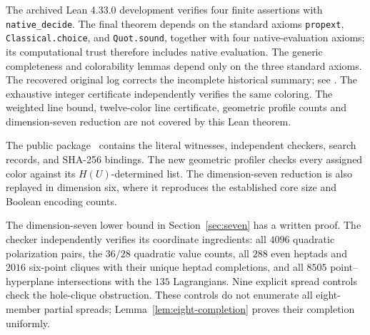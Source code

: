 The archived Lean 4.33.0 development verifies four finite assertions with
\texttt{native\_decide}. The final theorem depends on the standard axioms
\texttt{propext}, \texttt{Classical.choice}, and \texttt{Quot.sound}, together
with four native-evaluation axioms; its computational trust therefore includes
native evaluation. The generic completeness and colorability lemmas depend
only on the three standard axioms. The recovered original log corrects the
incomplete historical summary; see .
The exhaustive integer certificate independently verifies the same coloring.
The weighted line bound, twelve-color line certificate, geometric profile
counts and dimension-seven reduction
are not covered by this Lean theorem.

The public package~\cite{Package} contains the literal witnesses, independent
checkers, search records, and SHA-256 bindings. The new geometric profiler
checks every assigned color against its $H(U)$-determined list. The
dimension-seven reduction is also replayed in dimension six, where it
reproduces the established core size and Boolean encoding counts.

The dimension-seven lower bound in Section~\ref{sec:seven} has a
written proof. The checker
independently verifies its coordinate ingredients: all $4096$ quadratic
polarization pairs, the $36/28$ quadratic value counts, all $288$ even
heptads and $2016$ six-point cliques with their unique heptad completions,
and all $8505$ point--hyperplane intersections with the $135$ Lagrangians.
Nine explicit spread controls check the hole-clique obstruction.
These controls do not enumerate all eight-member partial spreads;
Lemma~\ref{lem:eight-completion} proves their completion uniformly.

